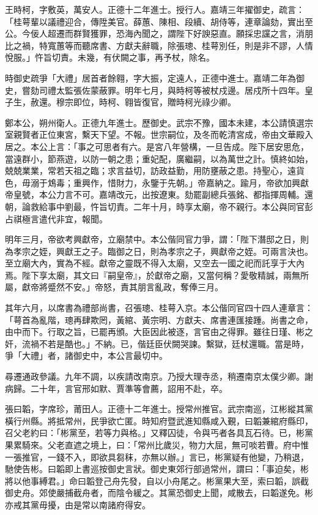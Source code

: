 \begin{pinyinscope}
王時柯，字敷英，萬安人。正德十二年進士。授行人。嘉靖三年擢御史，疏言：「桂萼輩以議禮迎合，傳陞美官。薛蕙、陳相、段續、胡侍等，連章論劾，實出至公。今佞人超遷而群賢獲罪，恐海內聞之，謂陛下好諛惡直。願採忠讜之言，消朋比之禍，特寬蕙等而聽席書、方獻夫辭職，除張璁、桂萼別任，則是非不謬，人情悅服。」忤旨切責。未幾，有伏闕之事，再予杖，除名。

時御史疏爭「大禮」居首者餘翱，字大振，定遠人，正德中進士。嘉靖二年為御史，嘗劾司禮太監張佐蒙蔽罪。明年七月，與時柯等被杖戍邊。居戍所十四年。皇子生，赦還。穆宗即位，時柯、翱皆復官，贈時柯光祿少卿。

鄭本公，朔州衛人。正德九年進士。歷御史。武宗不豫，國本未建，本公請慎選宗室親賢者正位東宮，繫天下望。不報。世宗嗣位，及冬而乾清宮成，帝由文華殿入居之。本公上言：「事之可思者有六。是宮八年營構，一旦告成。陛下居安思危，當遠群小，節燕遊，以防一朝之患；重妃配，廣繼嗣，以為萬世之計。慎終如始，兢兢業業，常若天祖之臨；求言益切，訪政益勤，用防壅蔽之患。持聖心，遠貨色，毋溺于鴆毒；重興作，惜財力，永鑒于先朝。」帝嘉納之。踰月，帝欲加興獻帝皇號，本公力言不可。嘉靖改元，出按遼東。劾罷副總兵張銘、都指揮周輔。還朝，論救給事中劉最，忤旨切責。二年十月，時享太廟，帝不親行。本公與同官彭占祺極言遣代非宜，報聞。

明年三月，帝欲考興獻帝，立廟禁中。本公偕同官力爭，謂：「陛下潛邸之日，則為孝宗之姪，興獻王之子。臨御之日，則為孝宗之子，興獻帝之姪。可兩言決也。至立廟大內，實為不經。獻帝之靈既不得入太廟，又空去一國之祀而託享于大內焉。陛下享太廟，其文曰『嗣皇帝』，於獻帝之廟，又當何稱？愛敬精誠，兩無所屬，獻帝將蹙然不安。」帝怒，責其朋言亂政，奪俸三月。

其年六月，以席書為禮部尚書，召張璁、桂萼入京。本公偕同官四十四人連章言：「萼首為亂階，璁再肆欺罔，黃綰、黃宗明、方獻夫、席書連匯接踵。尚書之命，由中而下。行取之旨，已罷再頒。大臣因此被逐，言官由之得罪。雖往日瑾、彬之奸，流禍不若是酷也。」不納。已，偕廷臣伏闕哭諫。繫獄，廷杖還職。當是時，爭「大禮」者，諸御史中，本公言最切中。

尋遷通政參議。九年不調，以疾請改南京。乃授大理寺丞，稍遷南京太僕少卿。謝病歸。二十年，言官邢如默、賈準等會薦，詔用不赴，卒。

張曰韜，字席珍，莆田人。正德十二年進士。授常州推官。武宗南巡，江彬縱其黨橫行州縣。將抵常州，民爭欲亡匿。時知府暨武進知縣咸入覲，曰韜兼綰府縣印，召父老約曰：「彬黨至，若等力與格。」又釋囚徒，令與丐者各具瓦石待。已，彬黨果累騎來。父老直遮之境上，曰：「常州比歲災，物力大屈，無可啖若曹。府中惟一張推官，一錢不入，即欲具芻秣，亦無以辦。」言已，彬黨疑有他變，乃稍退，馳使告彬。曰韜即上書巡按御史言狀。御史東郊行部過常州，謂曰：「事迫矣，彬將以他事縛君。」命曰韜登己舟先發，自以小舟尾之。彬黨果大至，索曰韜，誤截御史舟。郊使嚴捕截舟者，而陰令緩之。其黨恐御史上聞，咸散去，曰韜遂免。彬亦戒其黨毋擾，由是常以南諸府得安。


\end{pinyinscope}
